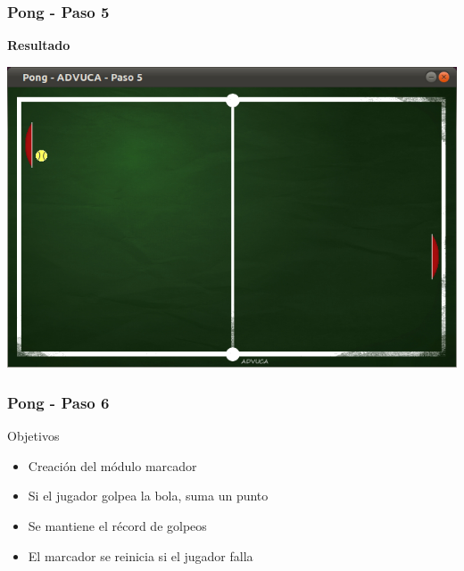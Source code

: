 \begin{frame}
	\frametitle{Pong - Paso 5}
	
    \begin{center}
        \textbf{Resultado}
    \end{center}
	
    \begin{center}
		\includegraphics[scale=0.4]{img/pong-advuca-5.png}
	\end{center}	

\end{frame}

\begin{frame}
	\frametitle{Pong - Paso 6}
	
	\begin{block}{Objetivos}
		\begin{itemize}
			\item Creación del módulo marcador
			\item Si el jugador golpea la bola, suma un punto
			\item Se mantiene el récord de golpeos
			\item El marcador se reinicia si el jugador falla
		\end{itemize}            
	\end{block}

\end{frame}

